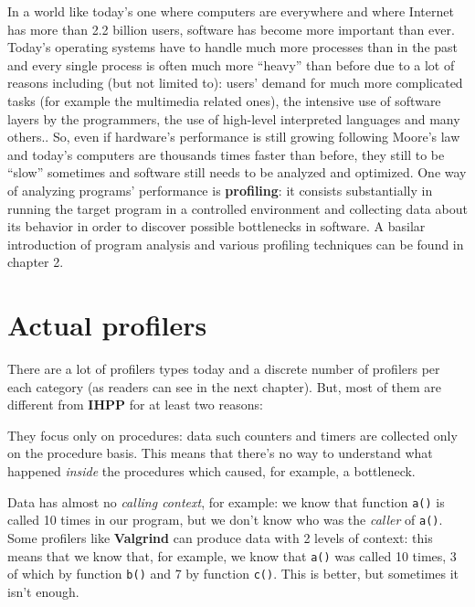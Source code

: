 \documentclass[a4paper,11pt]{report}
\begin{document}
In a world like today's one where computers are everywhere and where \mbox{Internet} has more than 2.2 billion users, software has become more important than ever. Today's operating systems have to handle much more processes than in the past and every single process is often much more ``heavy'' than before due to a lot of reasons including (but not limited to): users' demand for much more complicated tasks (for example the multimedia related ones), the intensive use of software layers by the programmers, the use of high-level interpreted languages and many others.. 
So, even if hardware's performance is still growing following Moore's law and today's computers are thousands times faster than before, they still to be ``slow'' sometimes and software still needs to be analyzed and optimized.
One way of analyzing programs' performance is \textbf{profiling}: it consists substantially in running the target program in a controlled environment and collecting data about its behavior in order to discover possible bottlenecks in software.
A basilar introduction of program analysis and various profiling techniques can be found in chapter 2.

\section{Actual profilers}

There are a lot of profilers types today and a discrete number of profilers per each category (as readers can see in the next chapter). But, most of them are different from \textbf{IHPP} for at least two reasons:

\begin{itemize*}
\item They focus only on procedures: data such counters and timers are collected only on the procedure basis. This means that there's no way to understand what happened \emph{inside} the procedures which caused, for example, a bottleneck.
\item Data has almost no \emph{calling context}, for example: we know that function \verb|a()| is called 10 times in our program, but we don't know who was the \emph{caller} of \verb|a()|. Some profilers like \textbf{Valgrind} can produce data with 2 levels of context: this means that we know that, for example, we know that \verb|a()| was called 10 times, 3 of which by function \verb|b()| and 7 by function \verb|c()|. This is better, but sometimes it isn't enough.
\end{itemize*}
\end{document}

